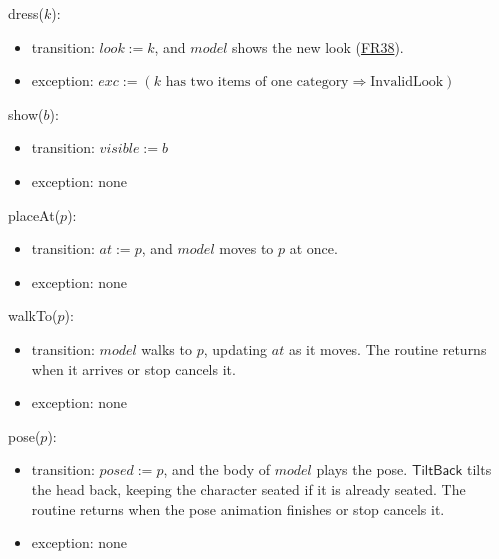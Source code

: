 \documentclass[10pt, titlepage]{article}
\newcommand{\srsurl}{https://team-hindsight.github.io/ophthamology-game/SRS/SRS.pdf}
\newcommand{\srsitemref}[2]{\href{\srsurl\#nameddest=#1}{#2}}
\newcommand{\T}[1]{\mathit{#1}}          %
\newcommand{\V}[1]{\mathsf{#1}}          %
\newcommand{\exc}{\mathit{exc}}
\begin{document}
\begin{samepage}
\noindent dress($k$):
\begin{itemize}
\item transition: $\T{look} := k$, and $\T{model}$ shows the new look
  (\srsitemref{FR_Equip}{FR38}).
\item exception: $\exc := (k \text{ has two items of one category}
  \Rightarrow \text{InvalidLook})$
\end{itemize}
\end{samepage}
\par\pagebreak[0]

\begin{samepage}
\noindent show($b$):
\begin{itemize}
\item transition: $\T{visible} := b$
\item exception: none
\end{itemize}
\end{samepage}
\par\pagebreak[0]

\begin{samepage}
\noindent placeAt($p$):
\begin{itemize}
\item transition: $\T{at} := p$, and $\T{model}$ moves to $p$ at once.
\item exception: none
\end{itemize}
\end{samepage}
\par\pagebreak[0]

\begin{samepage}
\noindent walkTo($p$):
\begin{itemize}
\item transition: $\T{model}$ walks to $p$, updating $\T{at}$ as it moves.
  The routine returns when it arrives or stop cancels it.
\item exception: none
\end{itemize}
\end{samepage}
\par\pagebreak[0]

\begin{samepage}
\noindent pose($p$):
\begin{itemize}
\item transition: $\T{posed} := p$, and the body of $\T{model}$ plays the pose.
  $\V{TiltBack}$ tilts the head back, keeping the character seated if it
  is already seated. The routine returns when the pose animation finishes
  or stop cancels it.
\item exception: none
\end{itemize}
\end{samepage}
\par\pagebreak[0]
\end{document}
